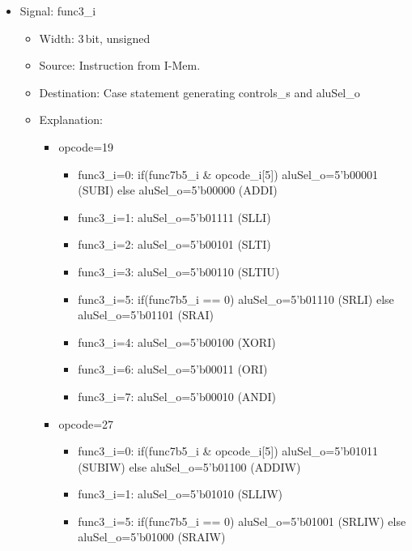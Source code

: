 \begin{itemize}
\begin{itemize}
\begin{itemize}
\begin{itemize}
        \item resultSrc\_o=2'b10; Mux (behind D-Mem) - D-Mem-data or PC+4 or ALU-result: PC+4 to RegFile
        \item branch\_s=0; Branch: No
        \item jump\_s=1; Only for jalr, jal
        \item aluSel\_o=5'b00000 (ADD)
      \end{itemize}
    \end{itemize}
  \end{itemize}
  \item Signal: func3\_i
  \begin{itemize}
    \item Width: 3\,bit, unsigned
    \item Source: Instruction from I-Mem.
    \item Destination: Case statement generating controls\_s and aluSel\_o
    \item Explanation: 
    \begin{itemize}
      \item opcode=19
      \begin{itemize}
        \item func3\_i=0: if(func7b5\_i \& opcode\_i[5]) aluSel\_o=5'b00001 (SUBI) else aluSel\_o=5'b00000 (ADDI)
        \item func3\_i=1: aluSel\_o=5'b01111 (SLLI)
        \item func3\_i=2: aluSel\_o=5'b00101 (SLTI)
        \item func3\_i=3: aluSel\_o=5'b00110 (SLTIU)
        \item func3\_i=5: if(func7b5\_i == 0) aluSel\_o=5'b01110 (SRLI) else aluSel\_o=5'b01101 (SRAI)
        \item func3\_i=4: aluSel\_o=5'b00100 (XORI)
        \item func3\_i=6: aluSel\_o=5'b00011 (ORI)
        \item func3\_i=7: aluSel\_o=5'b00010 (ANDI)
      \end{itemize}
      \item opcode=27
      \begin{itemize}
        \item func3\_i=0: if(func7b5\_i \& opcode\_i[5]) aluSel\_o=5'b01011 (SUBIW) else aluSel\_o=5'b01100 (ADDIW)
        \item func3\_i=1: aluSel\_o=5'b01010 (SLLIW)
        \item func3\_i=5: if(func7b5\_i == 0) aluSel\_o=5'b01001 (SRLIW) else aluSel\_o=5'b01000 (SRAIW)

\end{itemize}
\end{itemize}
\end{itemize}
\end{itemize}
